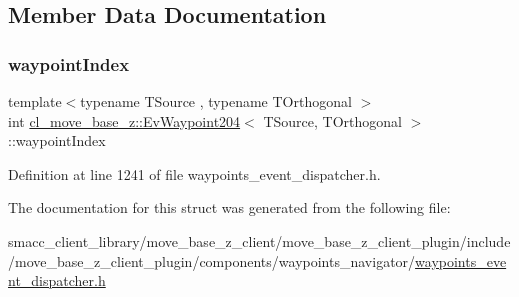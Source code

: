 \subsection{Member Data Documentation}
\mbox{\label{structcl__move__base__z_1_1EvWaypoint204_a89f5e0fca56bae75eb81cd0dc6ad3153}} 
\subsubsection{\texorpdfstring{waypoint\+Index}{waypointIndex}}
{\footnotesize\ttfamily template$<$typename T\+Source , typename T\+Orthogonal $>$ \\
int \hyperlink{structcl__move__base__z_1_1EvWaypoint204}{cl\+\_\+move\+\_\+base\+\_\+z\+::\+Ev\+Waypoint204}$<$ T\+Source, T\+Orthogonal $>$\+::waypoint\+Index}



Definition at line 1241 of file waypoints\+\_\+event\+\_\+dispatcher.\+h.



The documentation for this struct was generated from the following file\+:\begin{DoxyCompactItemize}
\item 
smacc\+\_\+client\+\_\+library/move\+\_\+base\+\_\+z\+\_\+client/move\+\_\+base\+\_\+z\+\_\+client\+\_\+plugin/include/move\+\_\+base\+\_\+z\+\_\+client\+\_\+plugin/components/waypoints\+\_\+navigator/\hyperlink{waypoints__event__dispatcher_8h}{waypoints\+\_\+event\+\_\+dispatcher.\+h}\end{DoxyCompactItemize}
